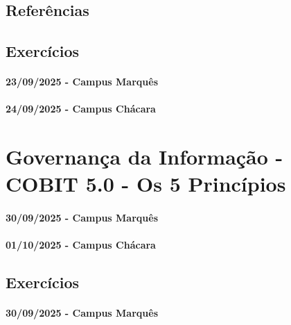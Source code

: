 \documentclass[
]{book}
\begin{document}
\section{Referências}\label{referuxeancias-7}

\section{Exercícios}\label{exercuxedcios-5}

\subsubsection*{23/09/2025 - Campus Marquês}\label{campus-marquuxeas-7}

\subsubsection*{24/09/2025 - Campus Chácara}\label{campus-chuxe1cara-7}

\chapter{Governança da Informação - COBIT 5.0 - Os 5 Princípios}\label{governanuxe7a-da-informauxe7uxe3o---cobit-5.0---os-5-princuxedpios}

\subsubsection*{30/09/2025 - Campus Marquês}\label{campus-marquuxeas-8}

\subsubsection*{01/10/2025 - Campus Chácara}\label{campus-chuxe1cara-8}

\section{Exercícios}\label{exercuxedcios-6}

\subsubsection*{30/09/2025 - Campus Marquês}\label{campus-marquuxeas-9}
\end{document}
